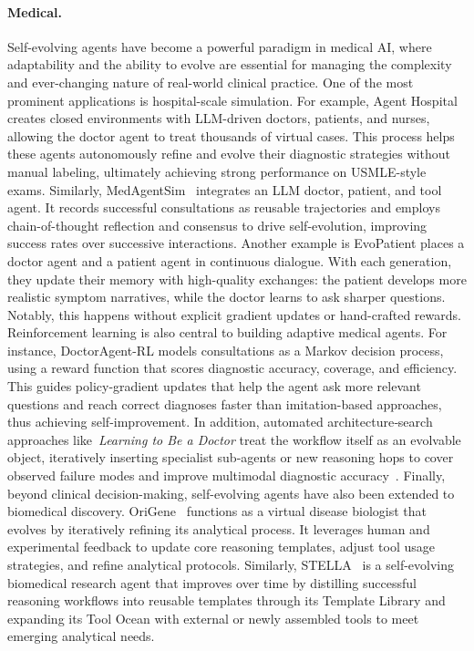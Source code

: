 \paragraph{Medical.}
Self-evolving agents have become a powerful paradigm in medical AI, where adaptability and the ability to evolve are essential for managing the complexity and ever-changing nature of real-world clinical practice.
One of the most prominent applications is hospital-scale simulation.
For example, Agent Hospital~\citep{agent2024hospital} creates closed environments with LLM-driven doctors, patients, and nurses, allowing the doctor agent to treat thousands of virtual cases. This process helps these agents autonomously refine and evolve their diagnostic strategies without manual labeling, ultimately achieving strong performance on USMLE-style exams.
Similarly, MedAgentSim~\citep{MedAgentSim2025} integrates an LLM doctor, patient, and tool agent. It records successful consultations as reusable trajectories and employs chain-of-thought reflection and consensus to drive self-evolution, improving success rates over successive interactions.
Another example is EvoPatient \citep{du2024evopatient} places a doctor agent and a patient agent in continuous dialogue. With each generation, they update their memory with high-quality exchanges: the patient develops more realistic symptom narratives, while the doctor learns to ask sharper questions. Notably, this happens without explicit gradient updates or hand-crafted rewards.
Reinforcement learning is also central to building adaptive medical agents. For instance, DoctorAgent-RL \citep{doctoragentRL2025} models consultations as a Markov decision process, using a reward function that scores diagnostic accuracy, coverage, and efficiency. This guides policy-gradient updates that help the agent ask more relevant questions and reach correct diagnoses faster than imitation-based approaches, thus achieving self-improvement.
In addition, automated architecture‑search approaches like~\textit{Learning to Be a Doctor} treat the workflow itself as an evolvable object, iteratively inserting specialist sub‑agents or new reasoning hops to cover observed failure modes and improve multimodal diagnostic accuracy~\citep{zhuang2025archsearch}. Finally, beyond clinical decision-making, self-evolving agents have also been extended to biomedical discovery. OriGene~\citep{zhang2025origene} functions as a virtual disease biologist that evolves by iteratively refining its analytical process. It leverages human and experimental feedback to update core reasoning templates, adjust tool usage strategies, and refine analytical protocols. Similarly, STELLA~\citep{jin2025stella} is a self-evolving biomedical research agent that improves over time by distilling successful reasoning workflows into reusable templates through its Template Library and expanding its Tool Ocean with external or newly assembled tools to meet emerging analytical needs.


